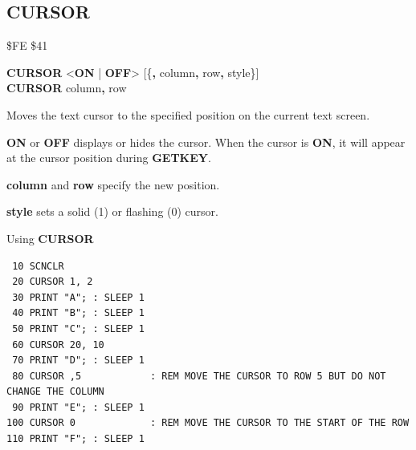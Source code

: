 \subsection{CURSOR}
\begin{description}[leftmargin=2cm,style=nextline]
\item [Token:]   \$FE \$41

\item [Format:]  {\bf CURSOR} <{\bf ON} | {\bf OFF}> [\{{\bf,} column{\bf,} row{\bf,} style\}] \\
                 {\bf CURSOR} column{\bf,} row{\bf}

\item [Usage:]   Moves the text cursor to the specified position on the current text screen.

                 {\bf ON} or {\bf OFF} displays or hides the cursor. When the cursor is {\bf ON}, it will appear at the cursor position during {\bf GETKEY}.

                 {\bf column} and {\bf row} specify the new position.

                 {\bf style} sets a solid (1) or flashing (0) cursor.

\item [Example:] Using {\bf CURSOR}
\begin{tcolorbox}[colback=black,coltext=white]
\verbatimfont{\codefont}
\begin{verbatim}
 10 SCNCLR
 20 CURSOR 1, 2
 30 PRINT "A"; : SLEEP 1
 40 PRINT "B"; : SLEEP 1
 50 PRINT "C"; : SLEEP 1
 60 CURSOR 20, 10
 70 PRINT "D"; : SLEEP 1
 80 CURSOR ,5            : REM MOVE THE CURSOR TO ROW 5 BUT DO NOT CHANGE THE COLUMN
 90 PRINT "E"; : SLEEP 1
100 CURSOR 0             : REM MOVE THE CURSOR TO THE START OF THE ROW
110 PRINT "F"; : SLEEP 1
\end{verbatim}
\end{tcolorbox}
\end{description}


\newpage
